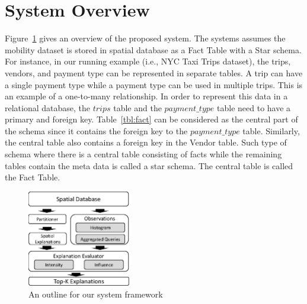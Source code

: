 \section{System Overview}
Figure~\ref{fig:framework} gives an overview of the proposed system. 
The systems assumes the mobility dataset is stored in spatial database as a Fact Table with a Star schema\cite{giovinazzo2000object,adamson2010star}. 
For instance, in our running example (i.e., NYC Taxi Trips dataset), the trips, vendors, and payment type can be represented in separate tables. A trip can have a single payment type while a payment type can be used in multiple trips. This is an example of a one-to-many relationship. 
In order to represent this data in a relational database, the $trips$ table and the $payment\_type$ table need to have a primary and foreign key. Table~\ref{tbl:fact} can be considered as the central part of the schema since it contains the foreign key to the $payment\_type$ table. Similarly, the central table also contains a foreign key in the Vendor table. Such type of schema where there is a central table consisting of facts while the remaining tables contain the meta data is called a star schema. The central table is called the Fact Table. 


\begin{figure}[t]
	\centering
	\includegraphics[width=0.4\textwidth]{images/architecture.eps}
	\caption{An outline for our system framework}
	\label{fig:framework}
\end{figure}




